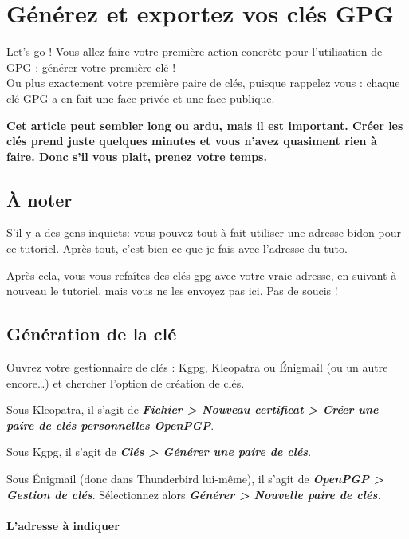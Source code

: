 \chapter{Générez et exportez vos clés GPG}

Let's go ! Vous allez faire votre première action concrète pour
l'utilisation de GPG : générer votre première clé !\\Ou plus exactement
votre première paire de clés, puisque rappelez vous : chaque clé GPG a
en fait une face privée et une face publique.

\textbf{Cet article peut sembler long ou ardu, mais il est important.
Créer les clés prend juste quelques minutes et vous n'avez quasiment
rien à faire. Donc s'il vous plait, prenez votre temps.}

\section{À noter}\label{uxe0-noter}

S'il y a des gens inquiets: vous pouvez tout à fait utiliser une adresse
bidon pour ce tutoriel. Après tout, c'est bien ce que je fais avec
l'adresse du tuto.

Après cela, vous vous refaîtes des clés gpg avec votre vraie adresse, en
suivant à nouveau le tutoriel, mais vous ne les envoyez pas ici. Pas de
soucis !

\section{Génération de la clé}\label{guxe9nuxe9ration-de-la-cluxe9}

Ouvrez votre gestionnaire de clés : Kgpg, Kleopatra ou Énigmail (ou un
autre encore\ldots{}) et chercher l'option de création de clés.

Sous Kleopatra, il s'agit de \textbf{\emph{Fichier \textgreater{}
Nouveau certificat \textgreater{} Créer une paire de clés personnelles
OpenPGP}}.

Sous Kgpg, il s'agit de \textbf{\emph{Clés \textgreater{} Générer une
paire de clés}}.

Sous Énigmail (donc dans Thunderbird lui-même), il s'agit de
\textbf{\emph{OpenPGP \textgreater{} Gestion de clés}}. Sélectionnez
alors \textbf{\emph{Générer \textgreater{} Nouvelle paire de clés.}}

\subsubsection{L'adresse à indiquer}\label{ladresse-uxe0-indiquer}

